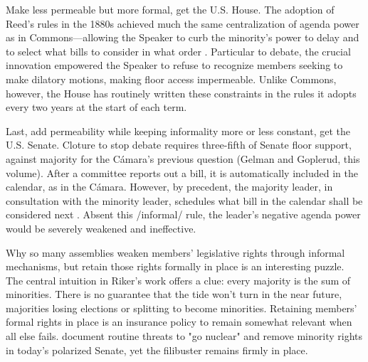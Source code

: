 \documentclass[letter,12pt]{article}
\begin{document}
Make less permeable but more formal, get the U.S. House. The adoption of Reed's rules in the 1880s achieved much the same centralization of agenda power as in Commons---allowing the Speaker to curb the minority's power to delay and to select what bills to consider in what order \citep{denhartog.2004phd,cox.mccubbins.2005}. Particular to debate, the crucial innovation empowered the Speaker to refuse to recognize members seeking to make dilatory motions, making floor access impermeable. Unlike Commons, however, the House has routinely written these constraints in the rules it adopts every two years at the start of each term.  

Last, add permeability while keeping informality more or less constant, get the U.S. Senate. Cloture to stop debate requires three-fifth of Senate floor support, against majority for the Cámara's previous question (Gelman and Goplerud, this volume). After a committee reports out a bill, it is automatically included in the calendar, as in the Cámara. However, by precedent, the majority leader, in consultation with the minority leader, schedules what bill in the calendar shall be considered next \citep{roberts-smith.2007,campbell.cox.mccubbins.2002}. Absent this /informal/ rule, the leader's negative agenda power would be severely weakened and ineffective.

Why so many assemblies weaken members' legislative rights through informal mechanisms, but retain those rights formally in place is an interesting puzzle. The central intuition in Riker's work offers a clue: every majority is the sum of minorities. There is no guarantee that the tide won't turn in the near future, majorities losing elections or splitting to become minorities. Retaining members' formal rights in place is an insurance policy to remain somewhat relevant when all else fails. \citet{wawro.schickler.filibuster.2007} document routine threats to "go nuclear" and remove minority rights in today's polarized Senate, yet the filibuster remains firmly in place.


\end{document}
